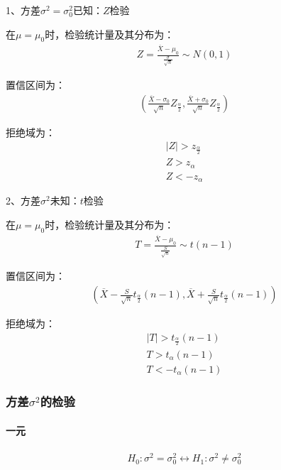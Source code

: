 \documentclass[12pt]{book}
\begin{document}
1、方差$\sigma^2 = \sigma^2_0$已知：$Z$检验

在$\mu = \mu_0$时，检验统计量及其分布为：
\begin{gather*}
    Z=\frac{\overline{X}-\mu_0}{\frac{\sigma}{\sqrt{n}}}\sim N(0,1)
\end{gather*}


置信区间为：
\begin{gather*}
    \left(\frac{\overline{X}-\sigma_0}{\sqrt{n}}Z_{\frac{\alpha}{2}}, \frac{\overline{X}+\sigma_0}{\sqrt{n}}Z_{\frac{\alpha}{2}} \right)
\end{gather*}


拒绝域为：
\begin{gather*}
    \left|Z\right|>z_{\frac{\alpha}{2}} \\
    Z >  z_\alpha\\
    Z < -z_\alpha
\end{gather*}


2、方差$\sigma^2$未知：$t$检验

在$\mu = \mu_0$时，检验统计量及其分布为：
\begin{gather*}
    T=\frac{\overline{X}-\mu_0}{\frac{S}{\sqrt{n}}}\sim t(n-1)
\end{gather*}


置信区间为：
\begin{gather*}
    \left( \overline{X}-\frac{S}{\sqrt{n}}t_{\frac{\alpha}{2}}(n-1), \overline{X}+\frac{S}{\sqrt{n}}t_{\frac{\alpha}{2}}(n-1) \right)
\end{gather*}


拒绝域为：
\begin{gather*}
    \left|T\right|>t_{\frac{\alpha}{2}}\left(n-1\right) \\
    T>t_\alpha\left(n-1\right) \\
    T<-t_\alpha\left(n-1\right)
\end{gather*}


\subsubsection{方差$\sigma^2$的检验}

\paragraph{一元}


\begin{gather*}
    H_0: \sigma^2=\sigma_0^2 \leftrightarrow H_1: \sigma^2\neq\sigma_0^2 \\
\end{gather*}
\end{document}
